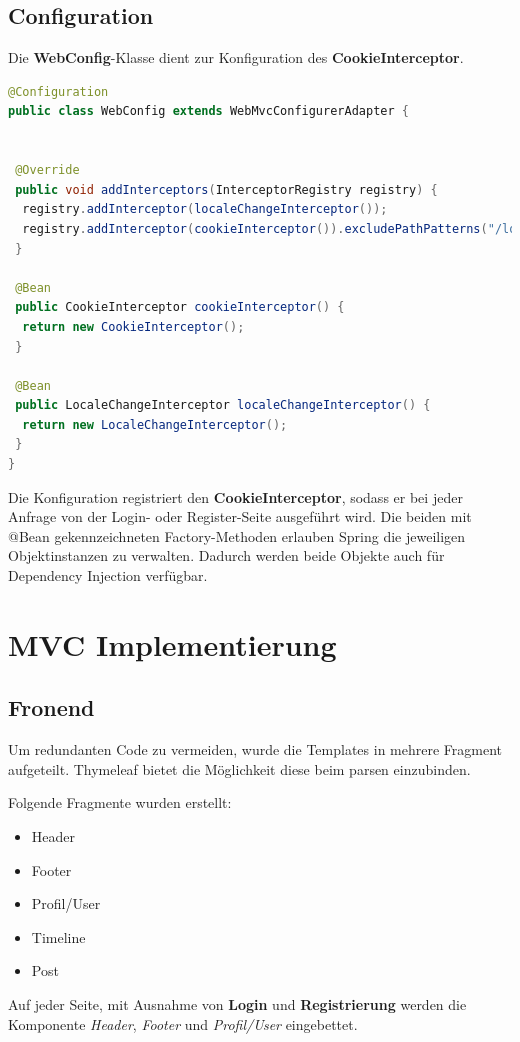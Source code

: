 \documentclass[
    a4paper
]{scrreprt}
\begin{document}
	\subsection{Configuration}
	Die \textbf{WebConfig}-Klasse dient zur Konfiguration des \textbf{CookieInterceptor}.
	\begin{lstlisting}[language=java]
@Configuration
public class WebConfig extends WebMvcConfigurerAdapter {


 @Override
 public void addInterceptors(InterceptorRegistry registry) {
  registry.addInterceptor(localeChangeInterceptor());
  registry.addInterceptor(cookieInterceptor()).excludePathPatterns("/login/**").excludePathPatterns("/registration/**").excludePathPatterns("/error/**");
 }

 @Bean
 public CookieInterceptor cookieInterceptor() {
  return new CookieInterceptor();
 }

 @Bean
 public LocaleChangeInterceptor localeChangeInterceptor() {
  return new LocaleChangeInterceptor();
 }
}
	\end{lstlisting}
	Die Konfiguration registriert den \textbf{CookieInterceptor}, sodass er bei jeder Anfrage von der Login- oder Register-Seite ausgeführt wird. Die beiden mit @Bean gekennzeichneten Factory-Methoden erlauben Spring die jeweiligen Objektinstanzen zu verwalten. Dadurch werden beide Objekte auch für Dependency Injection verfügbar.
	
    \section{MVC Implementierung}
    \subsection{Fronend}
	Um redundanten Code zu vermeiden, wurde die Templates in mehrere Fragment aufgeteilt. Thymeleaf bietet die Möglichkeit diese beim parsen einzubinden.
	
	Folgende Fragmente wurden erstellt:
	\begin{itemize} 
		\item Header
		\item Footer
		\item Profil/User
		\item Timeline
		\item Post
	\end{itemize}

	Auf jeder Seite, mit Ausnahme von \textbf{Login} und \textbf{Registrierung} werden die Komponente \textit{Header}, \textit{Footer} und \textit{Profil/User} eingebettet.
	
\end{document}
